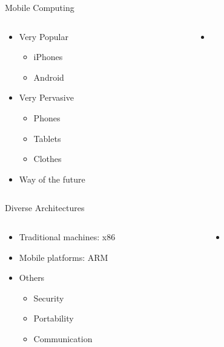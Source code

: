 \documentclass{beamer}
\begin{document}
\begin{frame}{Mobile Computing}
\begin{columns}
\begin{column}{5cm}
\begin{itemize}
	\item Very Popular
	\begin{itemize}
		\item iPhones
		\item Android
	\end{itemize}
	\item Very Pervasive
	\begin{itemize}
		\item Phones
		\item Tablets
		\item Clothes
	\end{itemize}
	\item Way of the future
\end{itemize}
\end{column}
\begin{column}{5cm}
\begin{itemize}
	\begin{itemize}
		\item {}
	\end{itemize}
\end{itemize}
\end{column}
\end{columns}
\end{frame}

\begin{frame}{Diverse Architectures}
\begin{columns}
\begin{column}{5cm}
\begin{itemize}
	\item Traditional machines: x86
	\item Mobile platforms: ARM
	\item Others
	\begin{itemize}
		\item Security
		\item Portability
		\item Communication
	\end{itemize}
\end{itemize}
\end{column}
\begin{column}{5cm}
\begin{itemize}
	\begin{itemize}
		\item {}
	\end{itemize}
\end{itemize}
\end{column}
\end{columns}
\end{frame}
\end{document}
